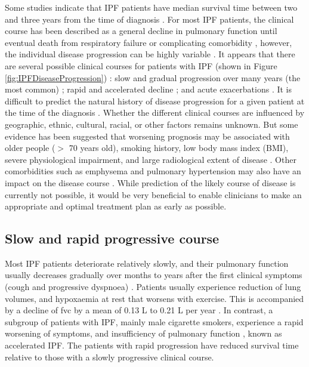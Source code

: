 Some studies indicate that IPF patients have median survival time between two and three years from the time of diagnosis \citep{bjoraker1998prognostic, flaherty2002clinical, nicholson2000prognostic, rudd2007british, king2001idiopathic, king2011idiopathic}. For most IPF patients, the clinical course has been described as a general decline in pulmonary function until eventual death from respiratory failure or complicating comorbidity \citep{carrington1978natural, tukiainen1983prognosis, gross2001idiopathic}, however, the individual disease progression can be highly variable \citep{kim2006classification,meltzer2008idiopathic}. It appears that there are several possible clinical courses for patients with IPF (shown in Figure \ref{fig:IPFDiseaseProgression}) \citep{raghu1987idiopathic}: slow and gradual progression over many years (the most common) \citep{ryu2014idiopathic,meltzer2008idiopathic,raghu2011official}; rapid and accelerated decline \citep{kim2006classification,selman2007accelerated}; and acute exacerbations \citep{king2011idiopathic,xaubet2017idiopathic}. It is difficult to predict the natural history of disease progression for a given patient at the time of the diagnosis \citep{raghu2011official}. Whether the different clinical courses are influenced by geographic, ethnic, cultural, racial, or other factors remains unknown. But some evidence has been suggested that worsening prognosis may be associated with older people ($>$ 70 years old), smoking history, low body mass index (BMI), severe physiological impairment, and large radiological extent of disease \citep{ley2011clinical}. Other comorbidities such as emphysema and pulmonary hypertension may also have an impact on the disease course \citep{mejia2009idiopathic, wells2003idiopathic, lettieri2006prevalence}. While prediction of the likely course of disease is currently not possible, it would be very beneficial to enable clinicians to make an appropriate and optimal treatment plan as early as possible.
\newpage

\subsection{Slow and rapid progressive course}
Most IPF patients deteriorate relatively slowly, and their pulmonary function usually decreases gradually over months to years after the first clinical symptoms (cough and progressive dyspnoea) \citep{ryu2014idiopathic,meltzer2008idiopathic,raghu2011official}. Patients usually experience reduction of lung volumes, and hypoxaemia at rest that worsens with exercise. This is accompanied by a decline of \gls{fvc}  by a mean of 0.13 L to 0.21 L per year \citep{ley2011clinical}. In contrast, a subgroup of patients with IPF, mainly male cigarette smokers, experience a rapid worsening of symptoms, and insufficiency of pulmonary function \citep{kim2006classification, king2011idiopathic}, known as accelerated IPF. The patients with rapid progression have reduced survival time relative to those with a slowly progressive clinical course.

